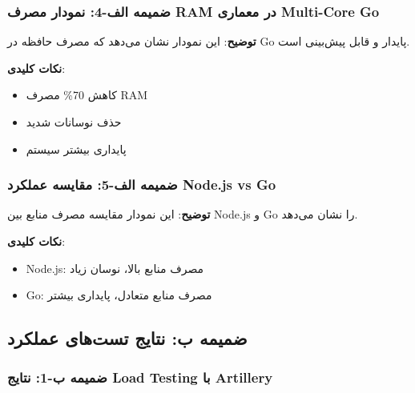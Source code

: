 \documentclass[
]{article}
\providecommand{\tightlist}{%
  \setlength{\itemsep}{0pt}\setlength{\parskip}{0pt}}
\begin{document}
\subsubsection{ضمیمه الف-4: نمودار مصرف RAM در معماری Multi-Core
Go}\label{ux636ux645ux6ccux645ux647-ux627ux644ux641-4-ux646ux645ux648ux62fux627ux631-ux645ux635ux631ux641-ram-ux62fux631-ux645ux639ux645ux627ux631ux6cc-multi-core-go}

\textbf{توضیح}: این نمودار نشان می‌دهد که مصرف حافظه در Go پایدار و قابل
پیش‌بینی است.

\textbf{نکات کلیدی}:

\begin{itemize}
\tightlist
\item
  کاهش 70\% مصرف RAM
\item
  حذف نوسانات شدید
\item
  پایداری بیشتر سیستم
\end{itemize}

\subsubsection{ضمیمه الف-5: مقایسه عملکرد Node.js vs
Go}\label{ux636ux645ux6ccux645ux647-ux627ux644ux641-5-ux645ux642ux627ux6ccux633ux647-ux639ux645ux644ux6a9ux631ux62f-node.js-vs-go}

\textbf{توضیح}: این نمودار مقایسه مصرف منابع بین Node.js و Go را نشان
می‌دهد.

\textbf{نکات کلیدی}:

\begin{itemize}
\tightlist
\item
  Node.js: مصرف منابع بالا، نوسان زیاد
\item
  Go: مصرف منابع متعادل، پایداری بیشتر
\end{itemize}

\subsection{ضمیمه ب: نتایج تست‌های
عملکرد}\label{ux636ux645ux6ccux645ux647-ux628-ux646ux62aux627ux6ccux62c-ux62aux633ux62aux647ux627ux6cc-ux639ux645ux644ux6a9ux631ux62f}

\subsubsection{ضمیمه ب-1: نتایج Load Testing با
Artillery}\label{ux636ux645ux6ccux645ux647-ux628-1-ux646ux62aux627ux6ccux62c-load-testing-ux628ux627-artillery}
\end{document}
